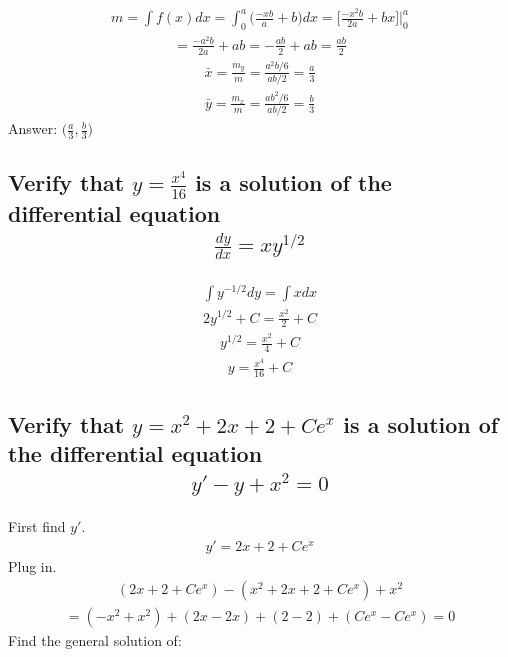 \documentclass{article}
\begin{document}
\begin{align*}
	m = \int f(x)dx = \int_0^a {\bigg( \frac{-xb}{a} + b \bigg)}dx = \bigg[ \frac{-x^2b}{2a} + bx \bigg] \bigg|_0^a
\end{align*}
\begin{align*}
	= \frac{-a^2b}{2a} + ab = -\frac{ab}{2} + ab = \frac{ab}{2}
\end{align*}
\begin{align*}
	\bar{x} = \frac{m_y}{m} = \frac{a^2b/6}{ab/2} = \frac{a}{3}
\end{align*}
\begin{align*}
	\bar{y} = \frac{m_x}{m} = \frac{ab^2/6}{ab/2} = \frac{b}{3}
\end{align*}
Answer: $\bigg( \frac{a}{3}, \frac{b}{3} \bigg)$

\subsection{Verify that $y = \frac{x^4}{16}$ is a solution of the differential equation
	\begin{align*}
		\frac{dy}{dx} = xy^{1/2}
	\end{align*}
}
\begin{align*}
	\int {y^{-1/2}}dy = \int {x}dx
\end{align*}
\begin{align*}
	2y^{1/2} + C = \frac{x^2}{2} + C
\end{align*}
\begin{align*}
	y^{1/2} = \frac{x^2}{4} + C
\end{align*}
\begin{align*}
	y = \frac{x^4}{16} + C
\end{align*}

\subsection{Verify that $y = x^2 + 2x + 2 + Ce^x$ is a solution of the differential equation
	\begin{align*}
		y' - y + x^2 = 0
	\end{align*}
}
First find $y'$.
\begin{align*}
	y' = 2x + 2 + Ce^x
\end{align*}
Plug in.
\begin{align*}
	(2x + 2 + Ce^x) - (x^2 + 2x + 2 + Ce^x) + x^2
\end{align*}
\begin{align*}
	= (-x^2 + x^2) + (2x - 2x) + (2 - 2) + (Ce^x - Ce^x) = 0
\end{align*}
Find the general solution of:
\end{document}
